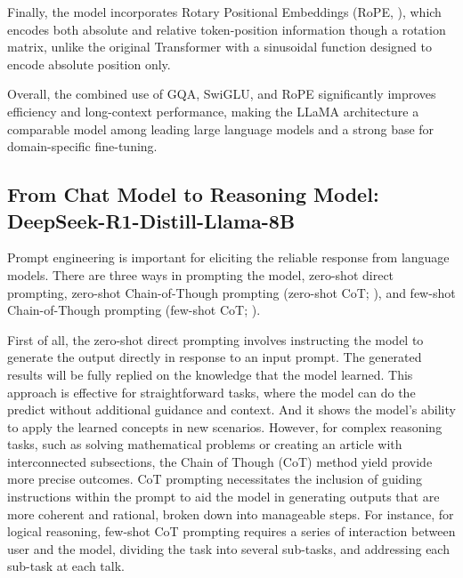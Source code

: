 
Finally, the model incorporates Rotary Positional Embeddings (RoPE, \cite{su2024roformer}), which encodes both absolute and relative token-position information though a rotation matrix, unlike the original Transformer with a sinusoidal function designed to encode absolute position only.


Overall, the combined use of GQA, SwiGLU, and RoPE significantly improves efficiency and long-context performance, making the LLaMA architecture a comparable model among leading large language models and a strong base for domain-specific fine-tuning.


\subsection*{From Chat Model to Reasoning Model: DeepSeek-R1-Distill-Llama-8B}


Prompt engineering is important for eliciting the reliable response from language models. There are three ways in prompting the model, zero-shot direct prompting, zero-shot Chain-of-Though prompting (zero-shot CoT; \cite{kojima2022large}), and few-shot Chain-of-Though prompting (few-shot CoT; \cite{wei2022chain}).

%
First of all, the zero-shot direct prompting involves instructing the model to generate the output directly in response to an input prompt. The generated results will be fully replied on the knowledge that the model learned. This approach is effective for straightforward tasks, where the model can do the predict without additional guidance and context. And it shows the model's ability to apply the learned concepts in new scenarios. However, for complex reasoning tasks, such as solving mathematical problems or creating an article with interconnected subsections, the Chain of Though (CoT) method yield provide more precise outcomes. CoT prompting necessitates the inclusion of guiding instructions within the prompt to aid the model in generating outputs that are more coherent and rational, broken down into manageable steps. For instance, for logical reasoning, few-shot CoT prompting requires a series of interaction between user and the model, dividing the task into several sub-tasks, and addressing each sub-task at each talk.


